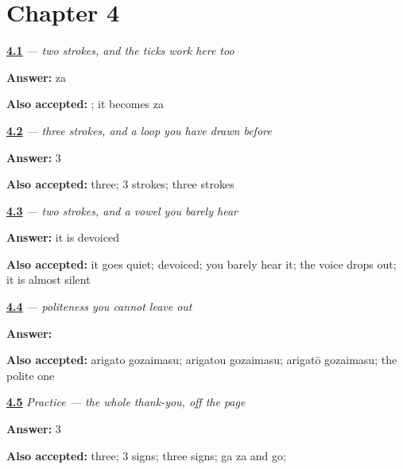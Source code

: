 \section*{Chapter 4}

\noindent\begin{minipage}[t]{\linewidth}
\raggedright
\hyperlink{review-JA-W03-sa-za}{\textbf{4.1}} \emph{ — two strokes, and the ticks work here too}\par
\small \textbf{Answer:} za\par
\footnotesize \textbf{Also accepted:} ; it becomes za
\end{minipage}\par\medskip

\noindent\begin{minipage}[t]{\linewidth}
\raggedright
\hyperlink{review-JA-W03-ma-strokes}{\textbf{4.2}} \emph{ — three strokes, and a loop you have drawn before}\par
\small \textbf{Answer:} 3\par
\footnotesize \textbf{Also accepted:} three; 3 strokes; three strokes
\end{minipage}\par\medskip

\noindent\begin{minipage}[t]{\linewidth}
\raggedright
\hyperlink{review-JA-W03-su-devoice}{\textbf{4.3}} \emph{ — two strokes, and a vowel you barely hear}\par
\small \textbf{Answer:} it is devoiced\par
\footnotesize \textbf{Also accepted:} it goes quiet; devoiced; you barely hear it; the voice drops out; it is almost silent
\end{minipage}\par\medskip

\noindent\begin{minipage}[t]{\linewidth}
\raggedright
\hyperlink{review-JA-C01-gozaimasu-level}{\textbf{4.4}} \emph{ — politeness you cannot leave out}\par
\small \textbf{Answer:} \par
\footnotesize \textbf{Also accepted:} arigato gozaimasu; arigatou gozaimasu; arigatō gozaimasu; the polite one
\end{minipage}\par\medskip

\noindent\begin{minipage}[t]{\linewidth}
\raggedright
\hyperlink{review-JA-C03-practice-ticks}{\textbf{4.5}} \emph{Practice — the whole thank-you, off the page}\par
\small \textbf{Answer:} 3\par
\footnotesize \textbf{Also accepted:} three; 3 signs; three signs; ga za and go;   
\end{minipage}\par\medskip

